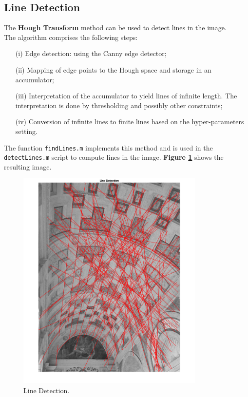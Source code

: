 \documentclass[12pt,a4paper]{article}
\begin{document}
\subsection{Line Detection}
\label{sec:lineDetection}
The \textbf{Hough Transform} method can be used to detect lines in the image.\\

The algorithm comprises the following steps:
\begin{itemize}
    \item[(i)] Edge detection: using the Canny edge detector;
    \item[(ii)] Mapping of edge points to the Hough space and storage in an accumulator;
    \item[(iii)] Interpretation of the accumulator to yield lines of infinite length. The interpretation is done by thresholding and possibly other constraints;
    \item[(iv)] Conversion of infinite lines to finite lines based on the hyper-parameters setting.
\end{itemize}
\bigskip
The function \verb|findLines.m| implements this method and is used in the \verb|detectLines.m| script to compute lines in the image. \textbf{Figure \ref{fig:lines}} shows the resulting image.

\begin{figure}[H]
    \centering
    \includegraphics[width=0.83\textwidth]{Images/PalazzoTe_lines.png}
    \caption[Line Detection.]{Line Detection.}
    \label{fig:lines}
\end{figure}
\end{document}
